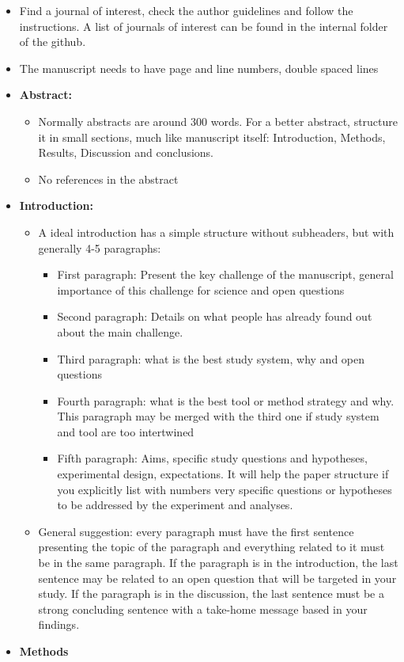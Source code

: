 \documentclass[
]{book}
\begin{document}
\begin{itemize}
\item
  Find a journal of interest, check the author guidelines and follow
  the instructions. A list of journals of interest can be found in the
  internal folder of the github.
\item
  The manuscript needs to have page and line numbers, double spaced
  lines
\item
  \textbf{Abstract:}

  \begin{itemize}
  \item
    Normally abstracts are around 300 words. For a better abstract,
    structure it in small sections, much like manuscript itself:
    Introduction, Methods, Results, Discussion and conclusions.
  \item
    No references in the abstract
  \end{itemize}
\item
  \textbf{Introduction:}

  \begin{itemize}
  \item
    A ideal introduction has a simple structure without subheaders,
    but with generally 4-5 paragraphs:

    \begin{itemize}
    \item
      First paragraph: Present the key challenge of the
      manuscript, general importance of this challenge for science
      and open questions
    \item
      Second paragraph: Details on what people has already found
      out about the main challenge.
    \item
      Third paragraph: what is the best study system, why and open
      questions
    \item
      Fourth paragraph: what is the best tool or method strategy
      and why. This paragraph may be merged with the third one if
      study system and tool are too intertwined
    \item
      Fifth paragraph: Aims, specific study questions and
      hypotheses, experimental design, expectations. It will help
      the paper structure if you explicitly list with numbers very
      specific questions or hypotheses to be addressed by the
      experiment and analyses.
    \end{itemize}
  \item
    General suggestion: every paragraph must have the first sentence
    presenting the topic of the paragraph and everything related to
    it must be in the same paragraph. If the paragraph is in the
    introduction, the last sentence may be related to an open
    question that will be targeted in your study. If the paragraph
    is in the discussion, the last sentence must be a strong
    concluding sentence with a take-home message based in your
    findings.
  \end{itemize}
\item
  \textbf{Methods}


\end{itemize}
\end{document}

